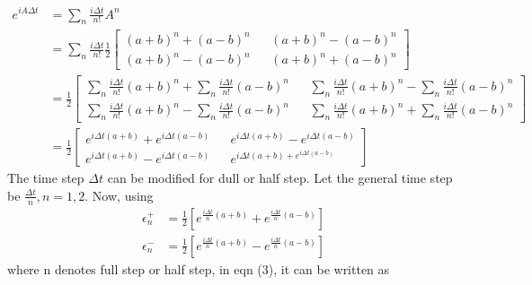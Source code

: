 \documentclass[11pt, oneside]{article}   	%
\begin{document}
\begin{align}
e^{i A \Delta t} &= \sum\limits_n \frac{i \Delta t}{n!} A^n \\
	&= \sum\limits_n \frac{i \Delta t}{n!} \frac{1}{2} \begin{bmatrix}
(a+b)^n + (a-b)^n && (a+b)^n - (a-b)^n \\
(a+b)^n - (a-b)^n && (a+b)^n + (a-b)^n
\end{bmatrix} \\
	&= \frac{1}{2} \begin{bmatrix}
\sum\limits_n \frac{i \Delta t}{n!} (a+b)^n + \sum\limits_n \frac{i \Delta t}{n!} (a-b)^n && \sum\limits_n \frac{i \Delta t}{n!} (a+b)^n - \sum\limits_n \frac{i \Delta t}{n!} (a-b)^n \\
\sum\limits_n \frac{i \Delta t}{n!} (a+b)^n - \sum\limits_n \frac{i \Delta t}{n!} (a-b)^n && \sum\limits_n \frac{i \Delta t}{n!} (a+b)^n + \sum\limits_n \frac{i \Delta t}{n!} (a-b)^n
\end{bmatrix} \\
	&= \frac{1}{2} \begin{bmatrix}
	e^{i \Delta t (a+b)} + e^{i \Delta t (a-b)} && e^{i \Delta t (a+b)} - e^{i \Delta t (a-b)} \\
	e^{i \Delta t (a+b)}- e^{i \Delta t (a-b)} && e^{i \Delta t (a+b) + e^{i \Delta t (a-b)}}
	\end{bmatrix}
\end{align}
The time step $\Delta t$ can be modified for dull or half step. Let the general time step be $ \frac{\Delta t}{n}, n=1,2$. Now, using
\begin{align}
\epsilon_n^+ &= \frac{1}{2} [e^{\frac{i \Delta t}{n} (a+b)}+ e^{\frac{i \Delta t}{n} (a-b)}] \\
\epsilon_n^- &= \frac{1}{2} [e^{\frac{i \Delta t}{n} (a+b)}- e^{\frac{i \Delta t}{n} (a-b)}]
\end{align}
where n denotes full step or half step, in eqn (3), it can be written as
\end{document}
